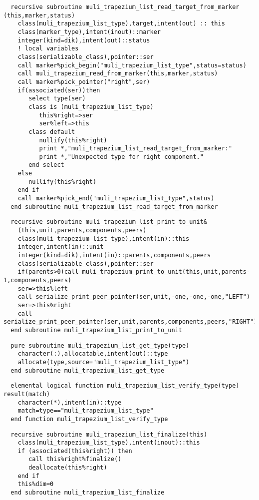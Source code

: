 \begin{Verbatim}
  recursive subroutine muli_trapezium_list_read_target_from_marker (this,marker,status)
    class(muli_trapezium_list_type),target,intent(out) :: this
    class(marker_type),intent(inout)::marker
    integer(kind=dik),intent(out)::status
    ! local variables
    class(serializable_class),pointer::ser
    call marker%pick_begin("muli_trapezium_list_type",status=status)
    call muli_trapezium_read_from_marker(this,marker,status)
    call marker%pick_pointer("right",ser)
    if(associated(ser))then
       select type(ser)
       class is (muli_trapezium_list_type)
          this%right=>ser
          ser%left=>this
       class default
          nullify(this%right)
          print *,"muli_trapezium_list_read_target_from_marker:"
          print *,"Unexpected type for right component."
       end select
    else
       nullify(this%right)
    end if
    call marker%pick_end("muli_trapezium_list_type",status)
  end subroutine muli_trapezium_list_read_target_from_marker
\end{Verbatim}
  
\begin{Verbatim}
  recursive subroutine muli_trapezium_list_print_to_unit&
    (this,unit,parents,components,peers)
    class(muli_trapezium_list_type),intent(in)::this
    integer,intent(in)::unit
    integer(kind=dik),intent(in)::parents,components,peers
    class(serializable_class),pointer::ser
    if(parents>0)call muli_trapezium_print_to_unit(this,unit,parents-1,components,peers)
    ser=>this%left
    call serialize_print_peer_pointer(ser,unit,-one,-one,-one,"LEFT")
    ser=>this%right
    call serialize_print_peer_pointer(ser,unit,parents,components,peers,"RIGHT")
  end subroutine muli_trapezium_list_print_to_unit
\end{Verbatim}
\begin{Verbatim}
  pure subroutine muli_trapezium_list_get_type(type)
    character(:),allocatable,intent(out)::type
    allocate(type,source="muli_trapezium_list_type")
  end subroutine muli_trapezium_list_get_type
\end{Verbatim}
\begin{Verbatim}
  elemental logical function muli_trapezium_list_verify_type(type) result(match)
    character(*),intent(in)::type
    match=type=="muli_trapezium_list_type"
  end function muli_trapezium_list_verify_type
\end{Verbatim}
\begin{Verbatim}
  recursive subroutine muli_trapezium_list_finalize(this)
    class(muli_trapezium_list_type),intent(inout)::this
    if (associated(this%right)) then
       call this%right%finalize()
       deallocate(this%right)
    end if
    this%dim=0
  end subroutine muli_trapezium_list_finalize
\end{Verbatim}

